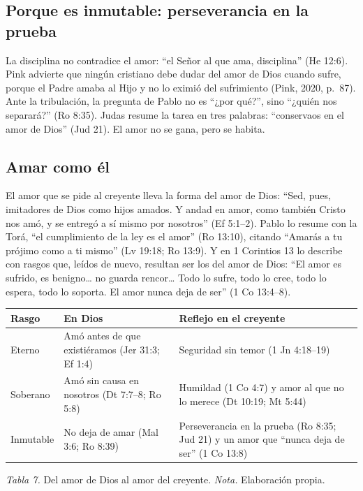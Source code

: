 \subsection{Porque es inmutable: perseverancia en la prueba}
La disciplina no contradice el amor: ``el Señor al que ama, disciplina'' (He 12:6). Pink advierte que ningún cristiano debe dudar del amor de Dios cuando sufre, porque el Padre amaba al Hijo y no lo eximió del sufrimiento (Pink, 2020, p.~87). Ante la tribulación, la pregunta de Pablo no es ``¿por qué?'', sino ``¿quién nos separará?'' (Ro 8:35). Judas resume la tarea en tres palabras: ``conservaos en el amor de Dios'' (Jud 21). El amor no se gana, pero se habita.

\subsection{Amar como él}
El amor que se pide al creyente lleva la forma del amor de Dios: ``Sed, pues, imitadores de Dios como hijos amados. Y andad en amor, como también Cristo nos amó, y se entregó a sí mismo por nosotros'' (Ef 5:1--2). Pablo lo resume con la Torá, ``el cumplimiento de la ley es el amor'' (Ro 13:10), citando ``Amarás a tu prójimo como a ti mismo'' (Lv 19:18; Ro 13:9). Y en 1 Corintios 13 lo describe con rasgos que, leídos de nuevo, resultan ser los del amor de Dios: ``El amor es sufrido, es benigno\ldots{} no guarda rencor\ldots{} Todo lo sufre, todo lo cree, todo lo espera, todo lo soporta. El amor nunca deja de ser'' (1 Co 13:4--8).

\begin{center}\small\renewcommand{\arraystretch}{1.2}
\begin{tabular}{@{}L{2.4cm}L{5.4cm}L{7.0cm}@{}}
\toprule
\textbf{Rasgo} & \textbf{En Dios} & \textbf{Reflejo en el creyente} \\ \midrule
Eterno & Amó antes de que existiéramos (Jer 31:3; Ef 1:4) & Seguridad sin temor (1 Jn 4:18--19) \\
Soberano & Amó sin causa en nosotros (Dt 7:7--8; Ro 5:8) & Humildad (1 Co 4:7) y amor al que no lo merece (Dt 10:19; Mt 5:44) \\
Inmutable & No deja de amar (Mal 3:6; Ro 8:39) & Perseverancia en la prueba (Ro 8:35; Jud 21) y un amor que ``nunca deja de ser'' (1 Co 13:8) \\
\bottomrule
\end{tabular}\par
{\footnotesize\color{gris}\textit{Tabla 7.} Del amor de Dios al amor del creyente. \textit{Nota.} Elaboración propia.}
\end{center}


